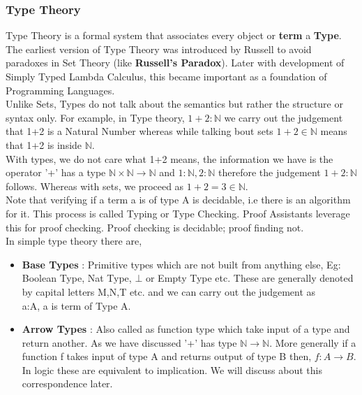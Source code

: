 \documentclass[12pt]{article}
\begin{document}
\subsubsection{Type Theory}
Type Theory is a formal system that associates every object or \textbf{term} a \textbf{Type}. The earliest version of Type Theory was introduced by Russell to avoid paradoxes in Set Theory (like \textbf{Russell's Paradox}). Later with development of Simply Typed Lambda Calculus, this became important as a foundation of Programming Languages.\\

Unlike Sets, Types do not talk about the semantics but rather the structure or syntax only. For example, in Type theory, $1+2:\mathbb{N}$ we carry out the judgement that 1+2 is a Natural Number whereas while talking bout sets $1+2 \in \mathbb{N}$  means that 1+2 is inside $\mathbb{N}$. \\With types, we do not care what 1+2 means, the information we have is the operator '+' has a type $\mathbb{N} \times \mathbb{N}  \to \mathbb{N}$ and  $1:\mathbb{N}, 2:\mathbb{N}$ therefore the judgement  $1+2:\mathbb{N}$ follows. Whereas with sets, we proceed as $1+2=3\in \mathbb{N}$.\\

Note that verifying if a term a is of type A is decidable, i.e there is an algorithm for it. This process is called Typing or Type Checking. Proof Assistants leverage this for proof checking. Proof checking is decidable; proof finding not. \cite{Geuvers2009}\\


In simple type theory there are, 
\begin{itemize}
    \item \textbf{Base Types} : Primitive types which are not built from anything else, Eg: Boolean Type, Nat Type, $\bot$ or Empty Type etc. These are generally denoted by capital letters M,N,T etc. and we can carry out the judgement as\\
        a:A, a is term of Type A.\\ 
        
    \item \textbf{Arrow Types} : Also called as function type which take input of a type and return another. As we have discussed '+' has type $\mathbb{N} \to \mathbb{N}$. More generally if a function f takes input of type A and returns output of type B then, $f:A \to B$. In logic these are equivalent to implication. We will discuss about this correspondence later.
    
\end{itemize}
\end{document}

